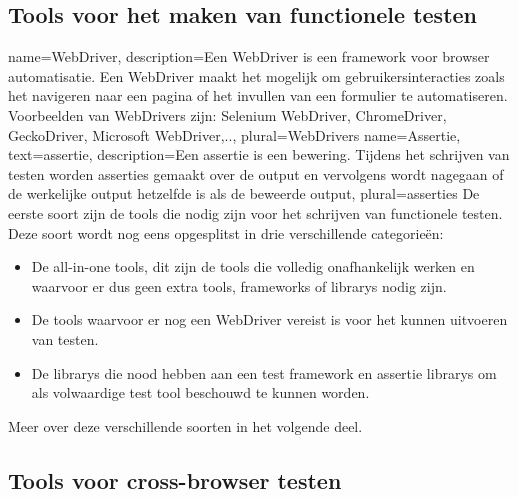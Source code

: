 \subsection{Tools voor het maken van functionele testen}
{
    name=WebDriver,
    description={Een WebDriver is een \gls{framework} voor browser automatisatie. Een WebDriver maakt het mogelijk om gebruikersinteracties zoals het navigeren naar een pagina of het invullen van een formulier te automatiseren. Voorbeelden van WebDrivers zijn: Selenium WebDriver, ChromeDriver, GeckoDriver, Microsoft WebDriver,..},
    plural={WebDrivers}
}
{
    name=Assertie,
    text=assertie,
    description={Een assertie is een bewering. Tijdens het schrijven van testen worden asserties gemaakt over de output en vervolgens wordt nagegaan of de werkelijke output hetzelfde is als de beweerde output},
    plural={asserties}
}
De eerste soort zijn de \glspl{tool} die nodig zijn voor het schrijven van functionele testen. Deze soort wordt nog eens opgesplitst in drie verschillende categorieën: 
\begin{itemize}
\item De all-in-one \glspl{tool}, dit zijn de \glspl{tool} die volledig onafhankelijk werken en waarvoor er dus geen extra \glspl{tool}, \glspl{framework} of \glspl{library} nodig zijn.
\item De \glspl{tool} waarvoor er nog een \gls{WebDriver} vereist is voor het kunnen uitvoeren van testen.
\item De \glspl{library} die nood hebben aan een test \gls{framework} en \gls{assertie} \glspl{library} om als volwaardige test \gls{tool} beschouwd te kunnen worden.
\end{itemize}
Meer over deze verschillende soorten in het volgende deel.


\subsection{Tools voor cross-browser testen}

